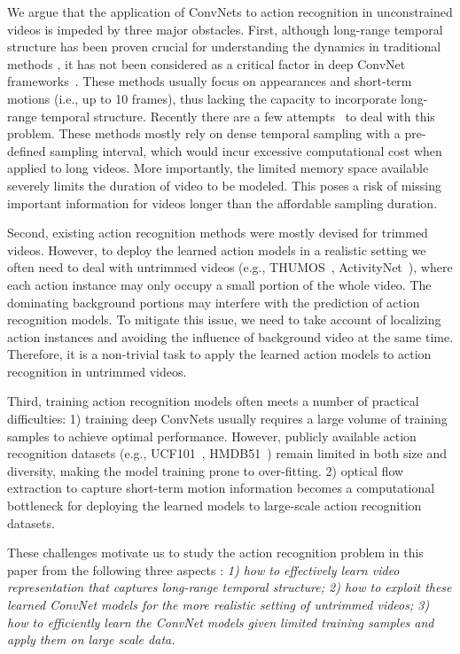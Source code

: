 \documentclass[10pt,journal,compsoc]{IEEEtran}
\begin{document}
We argue that the application of ConvNets to action recognition in unconstrained videos is impeded by three major obstacles.
First, although long-range temporal structure has been proven crucial for understanding the dynamics in traditional methods \cite{NieblesCF10,GaidonHS13,WangQT14a,FernandoGMGT15}, it has not been considered as a critical factor in deep ConvNet frameworks~\cite{KarpathyTSLSF14,SimonyanZ14,TranBFTP15}. These methods usually focus on appearances and short-term motions (i.e., up to 10 frames), thus lacking the capacity to incorporate long-range temporal structure.
Recently there are a few attempts~\cite{varol,Ng15,DonahueJ2015} to deal with this problem. These methods mostly rely on dense temporal sampling with a pre-defined sampling interval, which would incur excessive computational cost when applied to long videos. More importantly, the limited memory space available severely limits the duration of video to be modeled. This poses a risk of missing important information for videos longer than the affordable sampling duration.

Second, existing action recognition methods were mostly devised for trimmed videos. However, to deploy the learned action models in a realistic setting we often need to deal with untrimmed videos (e.g., THUMOS~\cite{THUMOS}, ActivityNet~\cite{HeilbronEGN15}), where each action instance may only occupy a small portion of the whole video. The dominating background portions may interfere with the prediction of action recognition models. To mitigate this issue, we need to take account of localizing action instances and avoiding the influence of background video at the same time. Therefore, it is a non-trivial task to apply the learned action models to action recognition in untrimmed videos.

Third, training action recognition models often meets a number of practical difficulties: 1) training deep ConvNets usually requires a large volume of training samples to achieve optimal performance. However, publicly available action recognition datasets (e.g., UCF101~\cite{Soomro12}, HMDB51~\cite{KuehneJGPS11}) remain limited in both size and diversity, making the model training prone to over-fitting. 2) optical flow extraction to capture short-term motion information becomes a computational bottleneck for deploying the learned models to large-scale action recognition datasets.

These challenges motivate us to study the action recognition problem in this paper from the following three aspects : \emph{1) how to effectively learn video representation that captures long-range temporal structure; 2) how to exploit these learned ConvNet models for the more realistic setting of untrimmed videos; 3) how to efficiently learn the ConvNet models given limited training samples and apply them on large scale data.} 
\end{document}
